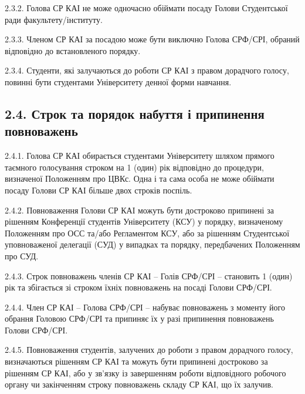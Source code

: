     2.3.2. Голова СР КАІ не може одночасно обіймати посаду Голови Студентської ради факультету/інституту.

    2.3.3. Членом СР КАІ за посадою може бути виключно Голова СРФ/СРІ, обраний відповідно до встановленого порядку.

    2.3.4. Студенти, які залучаються до роботи СР КАІ з правом дорадчого голосу, повинні бути студентами Університету денної форми навчання.

\subsection*{2.4. Строк та порядок набуття і припинення повноважень}
    2.4.1. Голова СР КАІ обирається студентами Університету шляхом прямого таємного голосування строком на 1 (один) рік відповідно до процедури, визначеної Положенням про ЦВКс. Одна і та сама особа не може обіймати посаду Голови СР КАІ більше двох строків поспіль.

    2.4.2. Повноваження Голови СР КАІ можуть бути достроково припинені за рішенням Конференції студентів Університету (КСУ) у порядку, визначеному Положенням про ОСС та/або Регламентом КСУ, або за рішенням Студентської уповноваженої делегації (СУД) у випадках та порядку, передбачених Положенням про СУД.

    2.4.3. Строк повноважень членів СР КАІ – Голів СРФ/СРІ – становить 1 (один) рік та збігається зі строком їхніх повноважень на посаді Голови СРФ/СРІ.

    2.4.4. Член СР КАІ – Голова СРФ/СРІ – набуває повноважень з моменту його обрання Головою СРФ/СРІ та припиняє їх у разі припинення повноважень Голови СРФ/СРІ.

    2.4.5. Повноваження студентів, залучених до роботи з правом дорадчого голосу, визначаються рішенням СР КАІ та можуть бути припинені достроково за рішенням СР КАІ, або у зв'язку із завершенням роботи відповідного робочого органу чи закінченням строку повноважень складу СР КАІ, що їх залучив. 